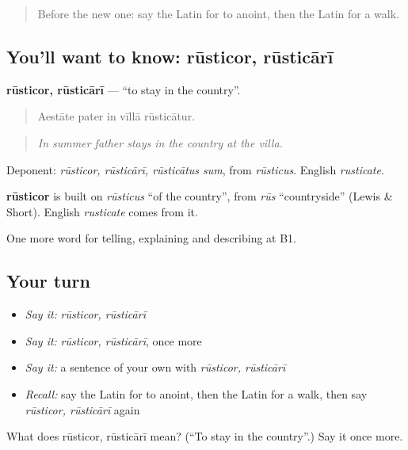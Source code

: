 \begin{quote}
Before the new one: say the Latin for to anoint, then the Latin for a walk.
\end{quote}

\subsection*{You'll want to know: rūsticor, rūsticārī}
\textbf{rūsticor, rūsticārī} — \textquotedblleft{}to stay in the country\textquotedblright{}.

\begin{quote}
Aestāte pater in vīllā rūsticātur.
\end{quote}

\begin{quote}
\emph{In summer father stays in the country at the villa.}
\end{quote}

Deponent: \emph{rūsticor, rūsticārī, rūsticātus sum}, from \emph{rūsticus}. English \emph{rusticate}.

\begin{cousinweb}
\textbf{rūsticor} is built on \emph{rūsticus} \textquotedblleft{}of the country\textquotedblright{}, from \emph{rūs} \textquotedblleft{}countryside\textquotedblright{} (Lewis \& Short). English \emph{rusticate} comes from it.
\end{cousinweb}

\begin{grammarlens}[title={What you've built}]
One more word for telling, explaining and describing at B1.
\end{grammarlens}

\subsection*{Your turn}
\begin{itemize}
\raggedright
  \item \emph{Say it:} \emph{rūsticor, rūsticārī}
  \item \emph{Say it:} \emph{rūsticor, rūsticārī}, once more
  \item \emph{Say it:} a sentence of your own with \emph{rūsticor, rūsticārī}
  \item \emph{Recall:} say the Latin for to anoint, then the Latin for a walk, then say \emph{rūsticor, rūsticārī} again
\end{itemize}

\begin{tcolorbox}[breakable,colback=teal!4,colframe=teal!35!black,title={Before you move on}]
What does rūsticor, rūsticārī mean? (\textquotedblleft{}To stay in the country\textquotedblright{}.) Say it once more.
\end{tcolorbox}
